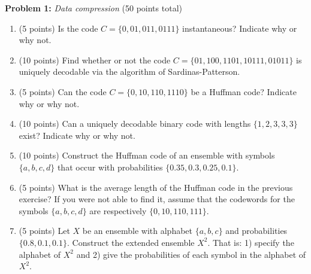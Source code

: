 \noindent \textbf{Problem 1:} \emph{Data compression} (50 points total)\\
\begin{enumerate}
\item (5 points) Is the code $C=\{0,01,011,0111\}$ instantaneous? Indicate why or why not.

\noindent{}
\item (10 points) Find whether or not the code $C=\{01,100,1101,10111,01011\}$ is uniquely decodable via the algorithm of Sardinas-Patterson.

\noindent{}\item (5 points) Can the code $C=\{0,10,110,1110\}$ be a Huffman code? Indicate why or why not.

\noindent{}\item (10 points) Can a uniquely decodable binary code with lengths $\{1,2,3,3,3\}$ exist? Indicate why or why not.

\noindent{}\item (10 points) Construct the Huffman code of an ensemble with symbols $\{a,b,c,d\}$ that occur with probabilities $\{0.35,0.3,0.25,0.1\}$.

\noindent{}\item (5 points) What is the average length of the Huffman code in the previous exercise? If you were not able to find it, assume that the codewords for the symbols $\{a,b,c,d\}$ are respectively $\{0,10,110,111\}$.

\noindent{}\item (5 points) Let $X$ be an ensemble with alphabet $\{a,b,c\}$ and probabilities $\{0.8,0.1,0.1\}$. Construct the extended ensemble $X^2$. That is: 1) specify the alphabet of $X^2$ and 2) give the probabilities of each symbol in the alphabet of $X^2$.


\end{enumerate}
